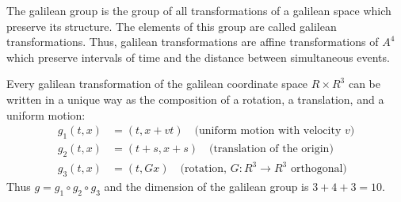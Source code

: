 The galilean group is the group of all transformations of a galilean space which preserve its structure. The elements of this group are called galilean transformations. Thus, galilean transformations are affine transformations of $A^4$ which preserve intervals of time and the distance between simultaneous events.

Every galilean transformation of the galilean coordinate space $R \times R^3$ can be written in a unique way as the composition of a rotation, a translation, and a uniform motion:
\begin{align*}
g_1(t, x) &= (t, x + vt) \quad \text{(uniform motion with velocity $v$)}\\
g_2(t, x) &= (t + s, x + s) \quad \text{(translation of the origin)}\\
g_3(t, x) &= (t, Gx) \quad \text{(rotation, $G: R^3 \to R^3$ orthogonal)}
\end{align*}
Thus $g = g_1 \circ g_2 \circ g_3$ and the dimension of the galilean group is $3 + 4 + 3 = 10$.
